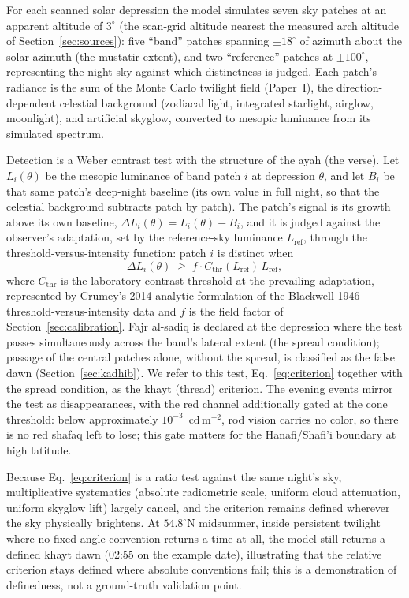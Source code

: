 \documentclass[preprint,12pt]{elsarticle}
\begin{document}
For each scanned solar depression the model simulates seven sky patches
at an apparent altitude of $3^\circ$ (the scan-grid altitude nearest
the measured arch altitude of
Section~\ref{sec:sources}): five ``band'' patches spanning
$\pm 18^\circ$ of azimuth about the solar azimuth (the mustatir extent),
and two ``reference'' patches at $\pm 100^\circ$, representing the night
sky against which distinctness is judged. Each patch's radiance is the
sum of the Monte Carlo twilight field (Paper~I), the direction-dependent
celestial background (zodiacal light, integrated starlight, airglow,
moonlight), and artificial skyglow, converted to mesopic luminance from
its simulated spectrum.

Detection is a Weber contrast test with the structure of the ayah (the
verse). Let
$L_i(\theta)$ be the mesopic luminance of band patch $i$ at depression
$\theta$, and let $B_i$ be that same patch's deep-night baseline (its
own value in full night, so that the celestial background subtracts
patch by patch). The patch's signal is its growth above its own
baseline, $\Delta L_i(\theta) = L_i(\theta) - B_i$, and it is judged
against the observer's adaptation, set by the reference-sky luminance
$L_{\mathrm{ref}}$, through the threshold-versus-intensity function:
patch $i$ is distinct when
\begin{equation}
\Delta L_i(\theta) \;\ge\; f \cdot C_{\mathrm{thr}}(L_{\mathrm{ref}})
\, L_{\mathrm{ref}},
\label{eq:criterion}
\end{equation}
where $C_{\mathrm{thr}}$ is the laboratory contrast threshold at the
prevailing adaptation, represented by Crumey's 2014 analytic
formulation of the Blackwell 1946 threshold-versus-intensity data
\citep{blackwell1946,crumey2014} and $f$ is the
field factor of Section~\ref{sec:calibration}. Fajr al-sadiq is declared
at the depression where the test passes simultaneously across the
band's lateral extent (the spread condition); passage of the central
patches alone, without the spread, is classified as the false dawn
(Section~\ref{sec:kadhib}). We refer to this test,
Eq.~\eqref{eq:criterion} together with the spread condition, as the
khayt (thread) criterion. The evening events mirror the test as
disappearances, with the red channel additionally gated at the cone
threshold: below approximately $10^{-3}$~cd\,m$^{-2}$, rod vision carries
no color, so there is no red shafaq left to lose; this gate matters
for the Hanafi/Shafi'i boundary at high latitude.

Because Eq.~\eqref{eq:criterion} is a ratio test against the same
night's sky, multiplicative systematics (absolute radiometric scale,
uniform cloud attenuation, uniform skyglow lift) largely cancel, and the
criterion remains defined wherever the sky physically brightens. At
$54.8^\circ$N midsummer, inside persistent twilight where no fixed-angle
convention returns a time at all, the model still returns a defined khayt
dawn (02:55 on the example date), illustrating that the relative
criterion stays defined where absolute conventions fail; this is a
demonstration of definedness, not a ground-truth validation point.
\end{document}
